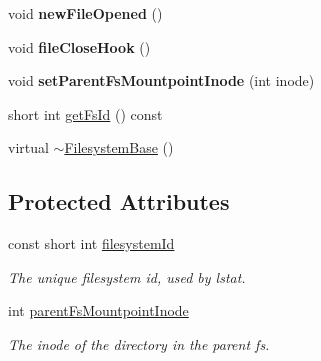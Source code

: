 \begin{DoxyCompactItemize}
\item 
\hypertarget{classmiosix_1_1_filesystem_base_a8af7a800e3e4cf97ea2ca1d9d7aa4bb4}{void {\bfseries new\-File\-Opened} ()}\label{classmiosix_1_1_filesystem_base_a8af7a800e3e4cf97ea2ca1d9d7aa4bb4}

\item 
\hypertarget{classmiosix_1_1_filesystem_base_a9c67a564264f8703e2495fe81c911ddb}{void {\bfseries file\-Close\-Hook} ()}\label{classmiosix_1_1_filesystem_base_a9c67a564264f8703e2495fe81c911ddb}

\item 
\hypertarget{classmiosix_1_1_filesystem_base_a82820b7321009a13fc509f35c14734ec}{void {\bfseries set\-Parent\-Fs\-Mountpoint\-Inode} (int inode)}\label{classmiosix_1_1_filesystem_base_a82820b7321009a13fc509f35c14734ec}

\item 
short int \hyperlink{classmiosix_1_1_filesystem_base_a020d26bbcda93a848025c94b8f1b26a5}{get\-Fs\-Id} () const 
\item 
virtual \hyperlink{classmiosix_1_1_filesystem_base_acffcb1fe373a7b69fc8bb63ee7df9b1d}{$\sim$\-Filesystem\-Base} ()
\end{DoxyCompactItemize}
\subsection*{Protected Attributes}
\begin{DoxyCompactItemize}
\item 
\hypertarget{classmiosix_1_1_filesystem_base_a5326080d985506aa1c6ae654fe8fb375}{const short int \hyperlink{classmiosix_1_1_filesystem_base_a5326080d985506aa1c6ae654fe8fb375}{filesystem\-Id}}\label{classmiosix_1_1_filesystem_base_a5326080d985506aa1c6ae654fe8fb375}

\begin{DoxyCompactList}\small\item\em The unique filesystem id, used by lstat. \end{DoxyCompactList}\item 
\hypertarget{classmiosix_1_1_filesystem_base_ab664739c4610f7c25416a1a7678cd73a}{int \hyperlink{classmiosix_1_1_filesystem_base_ab664739c4610f7c25416a1a7678cd73a}{parent\-Fs\-Mountpoint\-Inode}}\label{classmiosix_1_1_filesystem_base_ab664739c4610f7c25416a1a7678cd73a}

\begin{DoxyCompactList}\small\item\em The inode of the directory in the parent fs. \end{DoxyCompactList}\end{DoxyCompactItemize}
